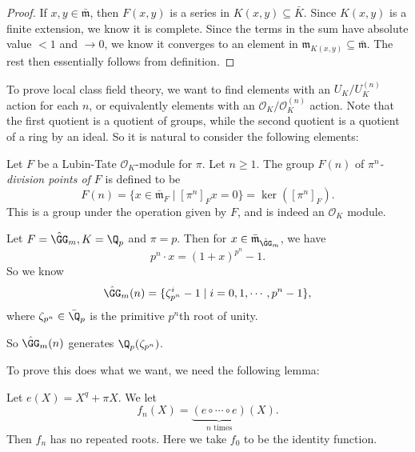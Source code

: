 \documentclass[a4paper]{article}
\begin{document}
\begin{proof}
  If $x, y \in \bar{\mathfrak{m}}$, then $F(x, y)$ is a series in $K(x, y) \subseteq \bar{K}$. Since $K(x, y) $ is a finite extension, we know it is complete. Since the terms in the sum have absolute value $< 1$ and $\to 0$, we know it converges to an element in $\mathfrak{m}_{K(x, y)} \subseteq \bar{\mathfrak{m}}$. The rest then essentially follows from definition.
\end{proof}

To prove local class field theory, we want to find elements with an $U_K/U_K^{(n)}$ action for each $n$, or equivalently elements with an $\mathcal{O}_K/\mathcal{O}_K^{(n)}$ action. Note that the first quotient is a quotient of groups, while the second quotient is a quotient of a ring by an ideal. So it is natural to consider the following elements:

\begin{defi}
  Let $F$ be a Lubin-Tate $\mathcal{O}_K$-module for $\pi$. Let $n \geq 1$. The group $F(n)$ of \emph{$\pi^n$-division points of $F$} is defined to be
  \[
    F(n) = \{x \in \bar{\mathfrak{m}}_F \mid [\pi^n]_F x= 0\} = \ker ([\pi^n]_F).
  \]
  This is a group under the operation given by $F$, and is indeed an $\mathcal{O}_K$ module.
\end{defi}

\begin{eg}
  Let $F = \hat{\GG}_m, K = \Q_p$ and $\pi = p$. Then for $x \in \bar{\mathfrak{m}}_{\hat{\GG}_m}$, we have
  \[
    p^n \cdot x = (1 + x)^{p^n} - 1.
  \]
  So we know
  \[
    \hat{\GG}_m(n) = \{\zeta_{p^n}^i - 1 \mid i = 0, 1, \cdots, p^n - 1\},
  \]
  where $\zeta_{p^n} \in \bar{\Q}_p$ is the primitive $p^n$th root of unity.

  So $\hat{\GG}_m(n)$ generates $\Q_p(\zeta_{p^n})$.
\end{eg}

To prove this does what we want, we need the following lemma:
\begin{lemma}
  Let $e(X) = X^q + \pi X$. We let
  \[
    f_n(X) = \underbrace{(e\circ \cdots \circ e)}_{n\text{ times}}(X).
  \]
  Then $f_n$ has no repeated roots. Here we take $f_0$ to be the identity function.
\end{lemma}
\end{document}
